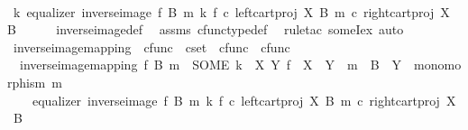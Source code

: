 \begin{isabellebody}
\ \ \isamarkupfalse%
\ \isamarkupfalse%
\ {\isachardoublequoteopen}{\isasymexists}k{\isachardot}{\kern0pt}\ equalizer\ {\isacharparenleft}{\kern0pt}inverse{\isacharunderscore}{\kern0pt}image\ f\ B\ m{\isacharparenright}{\kern0pt}\ k\ {\isacharparenleft}{\kern0pt}f\ {\isasymcirc}\isactrlsub c\ left{\isacharunderscore}{\kern0pt}cart{\isacharunderscore}{\kern0pt}proj\ X\ B{\isacharparenright}{\kern0pt}\ {\isacharparenleft}{\kern0pt}m\ {\isasymcirc}\isactrlsub c\ right{\isacharunderscore}{\kern0pt}cart{\isacharunderscore}{\kern0pt}proj\ X\ B{\isacharparenright}{\kern0pt}{\isachardoublequoteclose}\isanewline
\ \ \ \ \isamarkupfalse%
\ inverse{\isacharunderscore}{\kern0pt}image{\isacharunderscore}{\kern0pt}def\ \isamarkupfalse%
\ assms\ cfunc{\isacharunderscore}{\kern0pt}type{\isacharunderscore}{\kern0pt}def\ \isamarkupfalse%
\ {\isacharparenleft}{\kern0pt}rule{\isacharunderscore}{\kern0pt}tac\ someI{}{\isacharunderscore}{\kern0pt}ex{\isacharcomma}{\kern0pt}\ auto{\isacharparenright}{\kern0pt}\isanewline
{}\isamarkupfalse%
%
\endisatagproof
{\isafoldproof}%
%
\isadelimproof
\isanewline
%
\endisadelimproof
\isanewline
{}\isamarkupfalse%
\ inverse{\isacharunderscore}{\kern0pt}image{\isacharunderscore}{\kern0pt}mapping\ {\isacharcolon}{\kern0pt}{\isacharcolon}{\kern0pt}\ {\isachardoublequoteopen}cfunc\ {\isasymRightarrow}\ cset\ {\isasymRightarrow}\ cfunc\ {\isasymRightarrow}\ cfunc{\isachardoublequoteclose}\ \ \isanewline
\ \ {\isachardoublequoteopen}inverse{\isacharunderscore}{\kern0pt}image{\isacharunderscore}{\kern0pt}mapping\ f\ B\ m\ {\isacharequal}{\kern0pt}\ {\isacharparenleft}{\kern0pt}SOME\ k{\isachardot}{\kern0pt}\ {\isasymexists}\ X\ Y{\isachardot}{\kern0pt}\ f\ {\isacharcolon}{\kern0pt}\ X\ {\isasymrightarrow}\ Y\ {\isasymand}\ m\ {\isacharcolon}{\kern0pt}\ B\ {\isasymrightarrow}\ Y\ {\isasymand}\ monomorphism\ m\ {\isasymand}\isanewline
\ \ \ \ equalizer\ {\isacharparenleft}{\kern0pt}inverse{\isacharunderscore}{\kern0pt}image\ f\ B\ m{\isacharparenright}{\kern0pt}\ k\ {\isacharparenleft}{\kern0pt}f\ {\isasymcirc}\isactrlsub c\ left{\isacharunderscore}{\kern0pt}cart{\isacharunderscore}{\kern0pt}proj\ X\ B{\isacharparenright}{\kern0pt}\ {\isacharparenleft}{\kern0pt}m\ {\isasymcirc}\isactrlsub c\ right{\isacharunderscore}{\kern0pt}cart{\isacharunderscore}{\kern0pt}proj\ X\ B{\isacharparenright}{\kern0pt}{\isacharparenright}{\kern0pt}{\isachardoublequoteclose}\isanewline
\isanewline
{}\isamarkupfalse%

\end{isabellebody}
